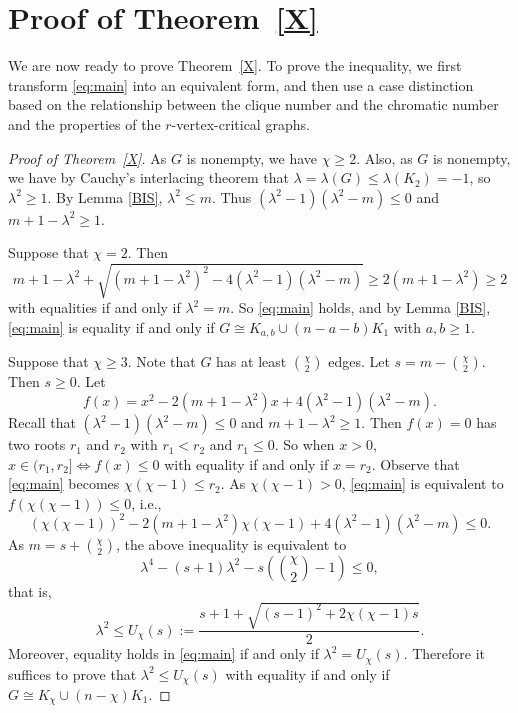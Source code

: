 \documentclass[12pt]{article}
\begin{document}
\section{Proof of Theorem~\ref{X}}

We are now ready to prove Theorem~\ref{X}. To prove the inequality, we first transform \eqref{eq:main} into an equivalent form, and then use a case distinction based on the relationship between the clique number and the chromatic number  and the properties of the $r$-vertex-critical graphs.

\begin{proof}[Proof of Theorem~\ref{X}]
%

 
As $G$ is nonempty, we have $\chi\ge 2$. Also, as $G$ is nonempty,  we have by Cauchy's interlacing theorem that $\lambda=\lambda (G)\le \lambda(K_2)= -1$, so $\lambda^2\ge 1$. By Lemma \ref{BIS}, $\lambda^2\le m$. Thus
 $(\lambda^2-1)(\lambda^2-m)\le 0$ and $m+1-\lambda^2\ge 1$. 


Suppose that $\chi=2$. Then \[
m+1-\lambda^2+\sqrt{(m+1-\lambda^2)^2-4(\lambda^2-1)(\lambda^2-m)}\ge 2(m+1-\lambda^2)\ge 2
\]
with equalities if and only if $\lambda^2=m$. So \eqref{eq:main} holds, and  by Lemma \ref{BIS}, 
\eqref{eq:main} is equality if and only if $G\cong K_{a,b}\cup (n-a-b)K_1$ with $a,b\ge 1$.

Suppose that $\chi\ge 3$. 
Note that $G$ has at least $\binom{\chi}{2}$ edges. Let $s = m-\binom{\chi}{2}$. Then $s\ge 0$. Let 
\[
f(x)=x^2 - 2(m+1-\lambda^2)x + 4(\lambda^2-1)(\lambda^2-m).
\]
Recall that  $(\lambda^2-1)(\lambda^2-m)\le 0$ and $m+1-\lambda^2\ge 1$. 
Then $f(x)=0$ has two roots $r_1$ and $r_2$ with $r_1< r_2$ and $r_1\le 0$. So when $x>0$, $x\in (r_1,r_2] \iff f(x)\le 0$ with equality if and only if $x=r_2$. 
Observe  that  \eqref{eq:main} becomes $\chi(\chi-1)\le r_2$. 
As $\chi(\chi-1)>0$, \eqref{eq:main} is equivalent to $f(\chi(\chi-1))\le 0$, i.e.,
\[
(\chi(\chi-1))^2-2(m+1-\lambda^2)\chi(\chi-1)+4(\lambda^2-1)(\lambda^2-m)\le 0.
\]
As $m=s+{\chi \choose 2}$, the above inequality is equivalent to 
\[
\lambda^4-(s+1)\lambda^2-s\left({\chi \choose 2}-1\right)\le 0,
\] 
that is, 
\[
\lambda^2 \le U_\chi(s) := \frac{s+1+\sqrt{(s-1)^2 + 2\chi(\chi-1)s}}{2}.
\]
Moreover, equality holds in \eqref{eq:main}  if and only if $\lambda^2= U_\chi(s)$. Therefore it suffices to prove that $\lambda^2 \le U_\chi(s)$ with equality if and only if $G\cong K_\chi \cup (n-\chi)K_1$.



\end{proof}
\end{document}
